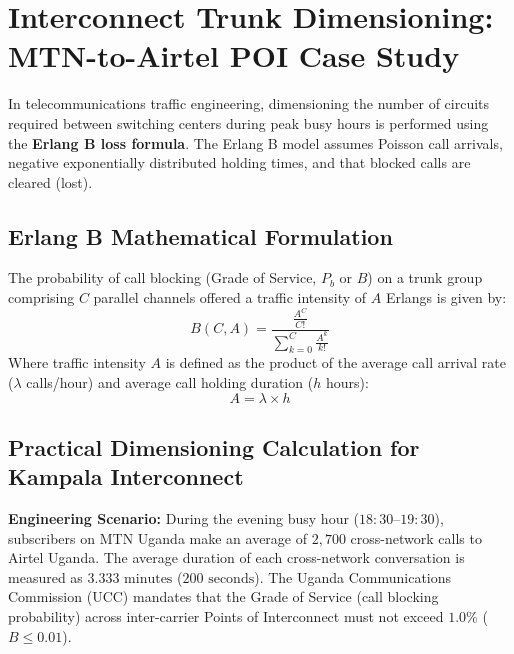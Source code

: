 \documentclass[12pt,a4paper]{report}
\begin{document}
\section{Interconnect Trunk Dimensioning: MTN-to-Airtel POI Case Study}
In telecommunications traffic engineering, dimensioning the number of circuits required between switching centers during peak busy hours is performed using the \textbf{Erlang B loss formula}. The Erlang B model assumes Poisson call arrivals, negative exponentially distributed holding times, and that blocked calls are cleared (lost).

\subsection{Erlang B Mathematical Formulation}
The probability of call blocking (Grade of Service, $P_b$ or $B$) on a trunk group comprising $C$ parallel channels offered a traffic intensity of $A$ Erlangs is given by:
\begin{equation}
B(C, A) = \frac{\frac{A^C}{C!}}{\sum_{k=0}^{C} \frac{A^k}{k!}}
\label{eq:erlang_b}
\end{equation}
Where traffic intensity $A$ is defined as the product of the average call arrival rate ($\lambda$ calls/hour) and average call holding duration ($h$ hours):
\[ A = \lambda \times h \]

\subsection{Practical Dimensioning Calculation for Kampala Interconnect}
\textbf{Engineering Scenario:} 
During the evening busy hour ($18:30\text{--}19:30$), subscribers on MTN Uganda make an average of $2,700$ cross-network calls to Airtel Uganda. The average duration of each cross-network conversation is measured as $3.333\text{ minutes}$ ($200\text{ seconds}$). The Uganda Communications Commission (UCC) mandates that the Grade of Service (call blocking probability) across inter-carrier Points of Interconnect must not exceed $1.0\%$ ($B \le 0.01$).
\end{document}
